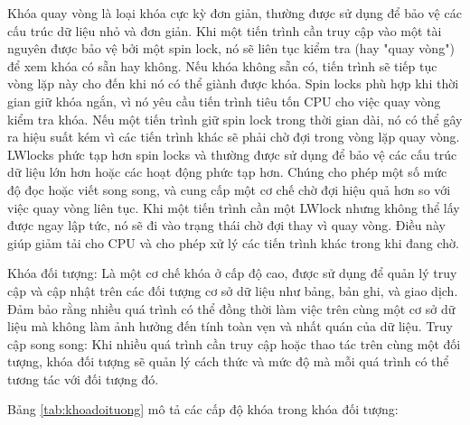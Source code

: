 \documentclass{article}[14pt]
\begin{document}
{Khóa quay vòng là loại khóa cực kỳ đơn giản, thường được sử dụng để bảo
vệ các cấu trúc dữ liệu nhỏ và đơn giản. Khi một tiến trình cần truy cập vào một tài nguyên được bảo vệ bởi một spin lock, nó sẽ liên tục kiểm tra (hay "quay vòng") để xem khóa có sẵn hay không. Nếu khóa không sẵn có, tiến trình sẽ tiếp tục vòng lặp này cho đến khi nó có thể giành được khóa. Spin locks phù hợp khi thời gian giữ khóa ngắn, vì nó yêu cầu tiến trình tiêu tốn CPU cho việc quay vòng kiểm tra khóa. Nếu một tiến trình giữ spin lock trong thời gian dài, nó có thể gây ra hiệu suất kém vì các tiến trình khác sẽ phải chờ đợi trong vòng lặp quay vòng.
LWlocks phức tạp hơn spin locks và thường được sử dụng để bảo vệ các cấu
trúc dữ liệu lớn hơn hoặc các hoạt động phức tạp hơn. Chúng cho phép một
số mức độ đọc hoặc viết song song, và cung cấp một cơ chế chờ đợi hiệu quả
hơn so với việc quay vòng liên tục. Khi một tiến trình cần một LWlock nhưng không thể lấy được ngay lập tức, nó sẽ đi vào trạng thái chờ đợi thay vì quay vòng. Điều này giúp giảm tải cho CPU và cho phép xử lý các tiến trình khác trong khi đang chờ.

Khóa đối tượng: Là một cơ chế khóa ở cấp độ cao, được sử dụng để quản lý
truy cập và cập nhật trên các đối tượng cơ sở dữ liệu như bảng, bản ghi, và giao dịch. Đảm bảo rằng nhiều quá trình có thể đồng thời làm việc trên cùng một cơ sở dữ liệu mà không làm ảnh hưởng đến tính toàn vẹn và nhất quán của dữ liệu. Truy cập song song: Khi nhiều quá trình cần truy cập hoặc thao tác trên cùng một đối tượng, khóa đối tượng sẽ quản lý cách thức và mức độ mà mỗi quá trình có thể tương tác với đối tượng đó.

Bảng \ref{tab:khoadoituong} mô tả các cấp độ khóa trong khóa đối tượng: 

}
\end{document}
